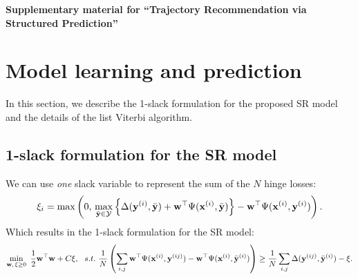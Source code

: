 
\appendix
\begin{center}
  {\Large\bf Supplementary material for ``Trajectory Recommendation via Structured Prediction''}
\end{center}


\section{Model learning and prediction}
\label{sec:supplement}

In this section, we describe the 1-slack formulation for the proposed SR model 
and the details of the list Viterbi algorithm.

\subsection{1-slack formulation for the SR model}
\label{ssec:1slack_sr}

We can use \emph{one} slack variable to represent the sum of the $N$ hinge losses:
\begin{equation*}
\xi_i = \max \left( 0, \, 
        \max_{\bar{\mathbf{y}} \in \mathcal{Y}}
        \left\{ \Delta(\mathbf{y}^{(i)}, \bar{\mathbf{y}}) + \mathbf{w}^\top \Psi(\mathbf{x}^{(i)}, \bar{\mathbf{y}}) \right\} - \mathbf{w}^\top \Psi(\mathbf{x}^{(i)}, \mathbf{y}^{(i)}) \right).
\end{equation*}
Which results in the 1-slack formulation for the SR model:
\begin{equation*}
\begin{aligned}
\min_{\mathbf{w}, \, \xi \ge 0} ~\frac{1}{2} \mathbf{w}^\top \mathbf{w} + C \xi, ~~s.t.~ \frac{1}{N} \left( \sum_{i,j} \mathbf{w}^\top \Psi(\mathbf{x}^{(i)}, \mathbf{y}^{(ij)}) - \mathbf{w}^\top \Psi(\mathbf{x}^{(i)}, \bar{\mathbf{y}}^{(i)}) \right) 
  \ge \frac{1}{N} \sum_{i,j} \Delta(\mathbf{y}^{(ij)}, \bar{\mathbf{y}}^{(i)}) - \xi.
\end{aligned}
\end{equation*}


